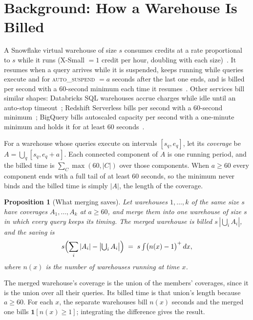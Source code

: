 \documentclass[conference]{IEEEtran}
\newcommand{\autos}{\textsc{auto\_suspend}}
\newtheorem{proposition}{Proposition}
\begin{document}
\section{Background: How a Warehouse Is Billed}\label{sec:billing}
A Snowflake virtual warehouse of size $s$ consumes credits at a rate proportional to $s$ while it runs (X-Small $=1$ credit
per hour, doubling with each size)~\cite{sf-warehouses}. It resumes when a query arrives while it is suspended, keeps
running while queries execute and for \autos{} $= a$ seconds after the last one ends, and is billed per second with a
60-second minimum each time it resumes~\cite{sf-create}. Other services bill similar shapes: Databricks SQL warehouses
accrue charges while idle until an auto-stop timeout~\cite{dbx-warehouse}; Redshift Serverless bills per second with a
60-second minimum~\cite{rs-serverless}; BigQuery bills autoscaled capacity per second with a one-minute minimum and holds it
for at least 60 seconds~\cite{bq-autoscale}.

For a warehouse whose queries execute on intervals $[s_q, e_q]$, let its \emph{coverage} be
$A = \bigcup_q [s_q, e_q + a]$. Each connected component of $A$ is one running period, and the billed time is
$\sum_C \max(60, |C|)$ over those components. When $a \ge 60$ every component ends with a full tail of at least 60 seconds,
so the minimum never binds and the billed time is simply $|A|$, the length of the coverage.

\begin{proposition}[What merging saves]\label{prop:merge}
Let warehouses $1,\dots,k$ of the same size $s$ have coverages $A_1,\dots,A_k$ at $a \ge 60$, and merge them into one
warehouse of size $s$ in which every query keeps its timing. The merged warehouse is billed $s\,|\bigcup_i A_i|$, and the
saving is
\[ s\Bigl(\sum_i |A_i| - \bigl|\textstyle\bigcup_i A_i\bigr|\Bigr) \;=\; s\int \bigl(n(x) - 1\bigr)^{+}\,dx, \]
where $n(x)$ is the number of warehouses running at time $x$.
\end{proposition}
\begin{IEEEproof}
The merged warehouse's coverage is the union of the members' coverages, since it is the union over all their queries. Its
billed time is that union's length because $a \ge 60$. For each $x$, the separate warehouses bill $n(x)$ seconds and the
merged one bills $\mathbf{1}[n(x) \ge 1]$; integrating the difference gives the result.
\end{IEEEproof}
\end{document}
